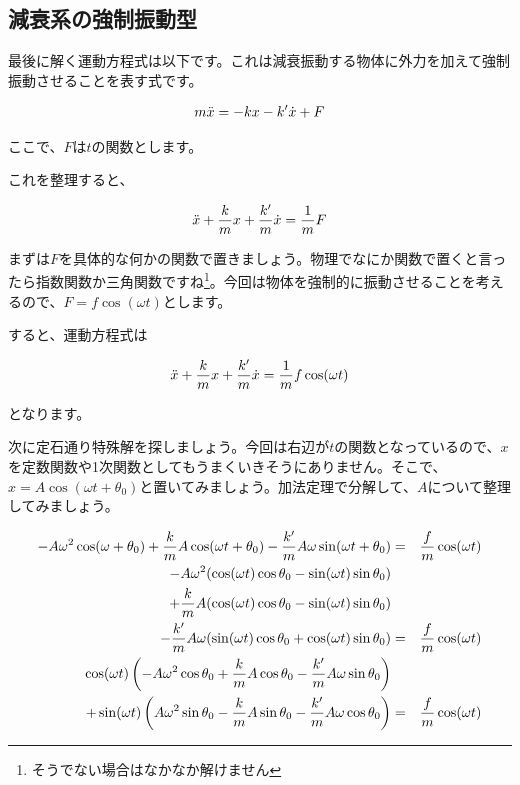 \subsection{減衰系の強制振動型}
\label{forcedvibration}
最後に解く運動方程式は以下です。これは減衰振動する物体に外力を加えて強制振動させることを表す式です。

\begin{eqnarray}
    m\ddot{x}=-kx-k'\dot{x}+F \notag
\end{eqnarray}

ここで、$F$は$t$の関数とします。

これを整理すると、

\begin{eqnarray}
    \ddot{x}+\frac{k}{m}x+\frac{k'}{m}\dot{x}=\frac{1}{m}F \notag
\end{eqnarray}

まずは$F$を具体的な何かの関数で置きましょう。物理でなにか関数で置くと言ったら指数関数か三角関数ですね\footnote{そうでない場合はなかなか解けません}。今回は物体を強制的に振動させることを考えるので、$F=f\cos(\omega t)$とします。

すると、運動方程式は

\begin{eqnarray}
    \ddot{x}+\frac{k}{m}x+\frac{k'}{m}\dot{x}=\frac{1}{m}f\cos(\omega t) \notag
\end{eqnarray}

となります。

次に定石通り特殊解を探しましょう。今回は右辺が$t$の関数となっているので、$x$を定数関数や1次関数としてもうまくいきそうにありません。そこで、$x=A\cos(\omega t + \theta_0)$と置いてみましょう。加法定理で分解して、$A$について整理してみましょう。

\begin{eqnarray}
    -A\omega^2\cos(\omega+\theta_0)+\frac{k}{m}A\cos(\omega t+\theta_0)-\frac{k'}{m}A\omega\sin(\omega t+\theta_0)&=&\frac{f}{m}\cos(\omega t) \notag \\
    -A\omega^2(\cos(\omega t)\cos\theta_0-\sin(\omega t)\sin\theta_0) \notag\\
    +\frac{k}{m}A(\cos(\omega t)\cos\theta_0-\sin(\omega t)\sin\theta_0) \notag\\
    -\frac{k'}{m}A\omega(\sin(\omega t)\cos\theta_0+\cos(\omega t)\sin\theta_0) &=& \frac{f}{m}\cos(\omega t) \notag \\
    \cos(\omega t)\left(-A\omega^2\cos\theta_0+\frac{k}{m}A\cos\theta_0-\frac{k'}{m}A\omega\sin\theta_0\right)\notag\\
    +\sin(\omega t)\left(A\omega^2\sin\theta_0-\frac{k}{m}A\sin\theta_0-\frac{k'}{m}A\omega\cos\theta_0\right)&=&\frac{f}{m}\cos(\omega t) \notag
\end{eqnarray}

